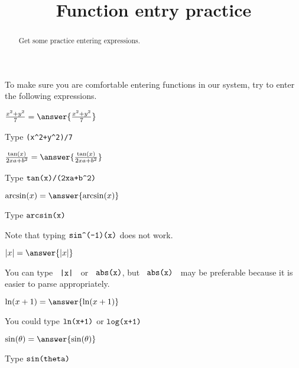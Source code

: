 \documentclass{ximera}
\title{Function entry practice}
\begin{document}
\begin{abstract}
	Get some practice entering expressions.
\end{abstract}
	To make sure you are comfortable entering functions in our system, try to enter the following expressions.

	\begin{problem}
		$\frac{x^2+y^2}{7} = \answer{\frac{x^2+y^2}{7}}$
		\begin{hint}
			Type \verb|(x^2+y^2)/7|
		\end{hint}
	\end{problem}

	\begin{problem}
		$\frac{\tan(x)}{2xa+b^2} = \answer{\frac{\tan(x)}{2xa+b^2} }$
		\begin{hint}
			Type $\verb|tan(x)/(2xa+b^2)|$
		\end{hint}
	\end{problem}

	\begin{problem}
		$\arcsin(x) = \answer{\arcsin(x)}$
		\begin{hint}
			Type $\verb|arcsin(x)|$
		\end{hint}
		\begin{feedback}
			Note that typing $\verb|sin^(-1)(x)|$ does not work.
		\end{feedback}
	\end{problem}

	\begin{problem}
		$ |x|  = \answer{|x|}$
		\begin{hint}
			You can type $\verb! |x| !$ or $\verb! abs(x)!$, but $\verb! abs(x) !$ may be preferable because it is easier to parse appropriately.
		\end{hint}
	\end{problem}

	\begin{problem}
		$\ln(x+1)= \answer{\ln(x+1)}$
		\begin{hint}
			You could type $\verb|ln(x+1)|$ or $\verb|log(x+1)|$
		\end{hint}
	\end{problem}

	\begin{problem}
		$ \sin(\theta) = \answer{\sin(\theta)}$
		\begin{hint}
			Type $\verb|sin(theta)|$
		\end{hint}
	\end{problem}
\end{document}
